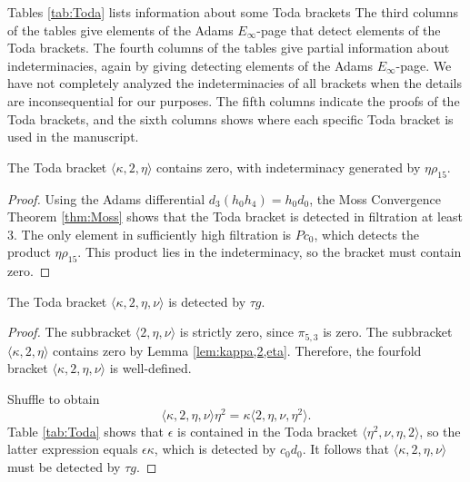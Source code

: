 Tables \ref{tab:Toda} lists information about some Toda brackets
The third columns of the tables give elements of the
Adams $E_\infty$-page that detect elements of the Toda brackets.
The fourth columns of the tables give partial
information about indeterminacies, again by giving detecting elements
of the Adams $E_\infty$-page.  We have not completely analyzed the
indeterminacies of all brackets when the details are inconsequential
for our purposes.  The fifth columns indicate the proofs of 
the Toda brackets, and the sixth columns shows where each specific
Toda bracket is used in the manuscript.



\begin{lemma}
\label{lem:kappa,2,eta}
The Toda bracket $\langle \kappa, 2, \eta \rangle$ contains
zero, with indeterminacy generated by $\eta \rho_{15}$.
\end{lemma}

\begin{proof}
Using the Adams differential $d_3(h_0 h_4) = h_0 d_0$, 
the Moss Convergence Theorem \ref{thm:Moss} shows that the
Toda bracket is detected in filtration at least $3$.  The
only element in sufficiently high filtration is $P c_0$, 
which detects the product $\eta \rho_{15}$.  This product
lies in the indeterminacy, so the bracket must contain
zero.
\end{proof}

\begin{lemma}
\label{lem:kappa,2,eta,nu}
The Toda bracket $\langle \kappa, 2, \eta, \nu \rangle$
is detected by $\tau g$.
\end{lemma}

\begin{proof}
The subbracket $\langle 2, \eta, \nu \rangle$ is strictly zero,
since $\pi_{5,3}$ is zero.  
The subbracket 
$\langle \kappa, 2, \eta \rangle$ contains zero by Lemma 
\ref{lem:kappa,2,eta}.
Therefore, the fourfold bracket
$\langle \kappa, 2, \eta, \nu \rangle$
is well-defined.

Shuffle to obtain
\[
\langle \kappa, 2, \eta, \nu \rangle \eta^2 = 
\kappa \langle 2, \eta, \nu, \eta^2 \rangle.
\]
Table \ref{tab:Toda} shows that $\epsilon$ is contained
in the Toda bracket $\langle \eta^2, \nu, \eta, 2 \rangle$, so
the latter expression equals $\epsilon \kappa$,
which is detected by $c_0 d_0$.
It follows that 
$\langle \kappa, 2, \eta, \nu \rangle$
must be detected by $\tau g$.
\end{proof}

